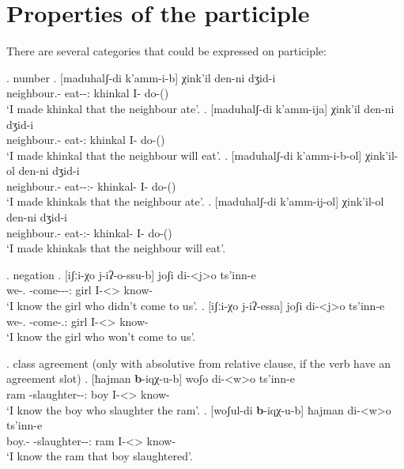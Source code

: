 \section{Properties of the participle}
There are several categories that could be expressed on participle:

\ex. number
	\ag. [maduhalʃ-di k'amm-i-b] χink'il den-ni dʒid-i\\
			{neighbour.\Obl-\Erg} {eat-\Pst-\Ptcp:\Pst} {khinkal}  {I-\Erg} {do-\Pst(\Aor)}\\
		 \glt    `I made khinkal that the neighbour ate'.
	\bg. [maduhalʃ-di k'amm-ija] χink'il den-ni dʒid-i\\
			{neighbour.\Obl-\Erg} {eat-\Ptcp:\Fut} {khinkal}  {I-\Erg} {do-\Pst(\Aor)}\\
		 \glt    `I made khinkal that the neighbour will eat'.	
	\bg. [maduhalʃ-di k'amm-i-b-ol] χink'il-ol den-ni dʒid-i\\
			{neighbour.\Obl-\Erg} {eat-\Pst-\Ptcp:\Pst-\Pl} {khinkal-\Pl}  {I-\Erg} {do-\Pst(\Aor)}\\
		 \glt    `I made khinkals that the neighbour ate'.
	\bg. [maduhalʃ-di k'amm-ij-ol] χink'il-ol den-ni dʒid-i\\
			{neighbour.\Obl-\Erg} {eat-\Ptcp:\Fut-\Pl} {khinkal-\Pl}  {I-\Erg} {do-\Pst(\Aor)}\\
		 \glt    `I made khinkals that the neighbour will eat'.	

\ex. negation
	\ag. [iʃːi-χo j-iʔ-o-ssu-b] joʃi di-<j>o ts'inn-e \\
		  {we-\Add.\Lat} {\F-come-\Pst-\Neg-\Ptcp:\Pst} {girl} {I-<\F>\Aff} {know-\Hab}\\
		 \glt    `I know the girl who didn't come to us'.
	\bg. [iʃːi-χo j-iʔ-essa] joʃi di-<j>o ts'inn-e \\
		  {we-\Add.\Lat} {\F-come-\Neg.\Ptcp:\Fut} {girl} {I-<\F>\Aff} {know-\Hab}\\
		 \glt    `I know the girl who won't come to us'.
		 
\ex. class agreement (only with absolutive from relative clause, if the verb have an agreement slot)
	\ag. [ħajman \textbf{b}-iqχ-u-b] woʃo di-<w>o ts'inn-e \\
			ram {\Nanf-slaughter-\Pst-\Ptcp:\Pst} boy {I-<\M>\Aff} {know-\Hab}\\
			\glt `I know the boy who slaughter the ram'.
	\bg. [woʃul-di \textbf{b}-iqχ-u-b] ħajman di-<w>o ts'inn-e \\
			{boy.\Obl-\Erg} {\Nanf-slaughter-\Pst-\Ptcp:\Pst} ram {I-<\M>\Aff} {know-\Hab}\\
			\glt `I know the ram that boy slaughtered'.	
			

